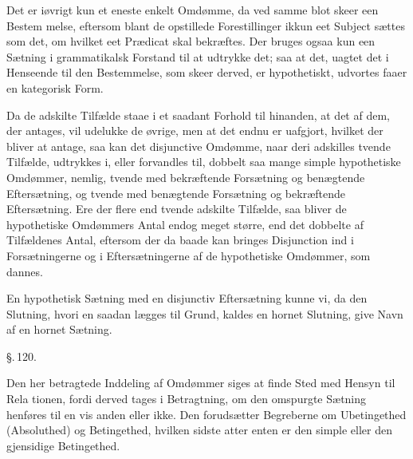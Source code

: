 \documentclass[12pt]{book}
\def\textit#1{#1}%
\def\emph#1{#1}%
\newcommand{\parag}[1]{%
  \par\vspace{0.9\baselineskip}%
  {\centering\textit{\S.\,#1.}\par}%
  \vspace{0.35\baselineskip}%
  \noindent\hspace{\parindent}\ignorespaces
}
\newcommand{\opage}[1]{\marginnote{\footnotesize\textit{[#1]}}}
\begin{document}
Det er iøvrigt kun et eneste enkelt Omdømme, da ved samme blot skeer een Bestem%
\opage{292}melse, eftersom blant de opstillede Forestillinger ikkun eet Subject sættes som
det, om hvilket eet Prædicat skal bekræftes. Der bruges ogsaa kun een Sætning i
grammatikalsk Forstand til at udtrykke det; saa at det, uagtet det i Henseende
til den Bestemmelse, som skeer derved, er hypothetiskt, udvortes faaer en
kategorisk Form.

Da de adskilte Tilfælde staae i et saadant Forhold til hinanden, at det af dem,
der antages, vil udelukke de øvrige, men at det endnu er uafgjort, hvilket der
bliver at antage, saa kan det disjunctive Omdømme, naar deri adskilles tvende
Tilfælde, udtrykkes i, eller forvandles til, dobbelt saa mange simple
hypothetiske Omdømmer, nemlig, tvende med bekræftende Forsætning og benægtende
Eftersætning, og tvende med benægtende Forsætning og bekræftende Eftersætning.
Ere der flere end tvende adskilte Tilfælde, saa bliver de hypothetiske
Omdømmers Antal endog meget større, end det dobbelte af Tilfældenes Antal,
eftersom der da baade kan bringes Disjunction ind i Forsætningerne og i
Eftersætningerne af de hypothetiske Omdømmer, som dannes.

En hypothetisk Sætning med en disjunctiv Eftersætning kunne vi, da den Slutning,
hvori en saadan lægges til Grund, kaldes en \emph{hornet} Slutning, give Navn af
en \emph{hornet} Sætning.

\parag{120}

Den her betragtede Inddeling af Omdømmer siges at finde Sted med Hensyn til Rela%
\opage{293}tionen, fordi derved tages i Betragtning, om den omspurgte Sætning henføres til
en vis anden eller ikke. Den forudsætter Begreberne om Ubetingethed (Absoluthed)
og Betingethed, hvilken sidste atter enten er den simple eller den gjensidige
Betingethed.
\end{document}
